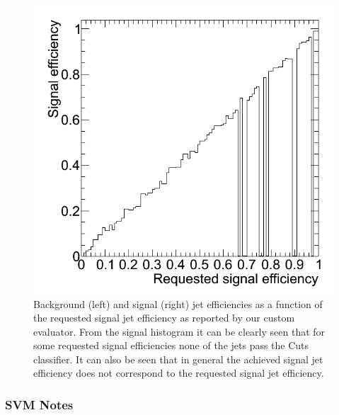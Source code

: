 \begin{figure}[h]
\begin{center}
\begin{minipage}{.3\textwidth}
      \includegraphics[width=\textwidth]{images/mk_cuts-eval-effS}
    \end{minipage}
  \end{center}
  \caption{Background (left) and signal (right) jet efficiencies as a
    function of the requested signal jet efficiency as reported by our
    custom evaluator. From the signal histogram it can be clearly seen
    that for some requested signal efficiencies none of the jets pass
    the Cuts classifier. It can also be seen that in general the
    achieved signal jet efficiency does not correspond to the
    requested signal jet efficiency.}
  \label{fig:mkCutsEvalEff}
\end{figure}

\subsubsection{SVM Notes}

